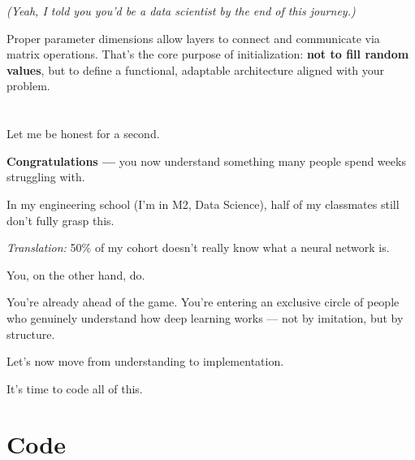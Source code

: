 \documentclass[11pt]{article}
\begin{document}
\textit{(Yeah, I told you you'd be a data scientist by the end of this journey.)}

\vspace{1em}

\begin{tcolorbox}[colback=green!5!white, colframe=green!50!black, title=Key Takeaway]
Proper parameter dimensions allow layers to connect and communicate via matrix operations.  
That’s the core purpose of initialization: \textbf{not to fill random values},  
but to define a functional, adaptable architecture aligned with your problem.
\end{tcolorbox}


\section*{}

\vspace{0.5em}

Let me be honest for a second.

\vspace{0.5em}

\textbf{Congratulations —} you now understand something many people spend weeks struggling with.

In my engineering school (I’m in M2, Data Science),  
half of my classmates still don’t fully grasp this.

\textit{Translation:} 50\% of my cohort doesn’t really know what a neural network is.

\vspace{1em}

You, on the other hand, do.

You're already ahead of the game.  
You're entering an exclusive circle of people who genuinely understand how deep learning works — not by imitation, but by structure.

\vspace{1em}

\begin{tcolorbox}[colback=blue!5!white, colframe=blue!80!black, title=Ready for the Next Step]
Let’s now move from understanding to implementation.

It’s time to code all of this.
\end{tcolorbox}
\section*{Code}
\end{document}
